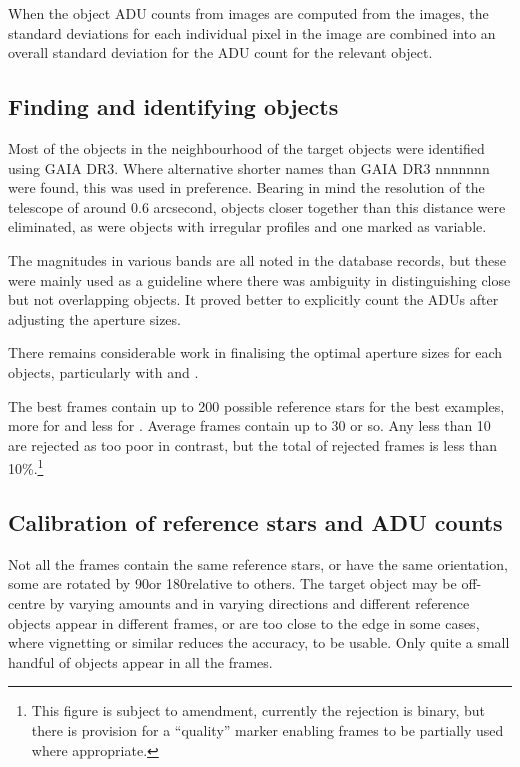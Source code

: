 When the object ADU counts from {\rem} images are computed from the images, the
standard deviations for each individual pixel in the image are combined into an
overall standard deviation for the ADU count for the relevant object.

\subsection{Finding and identifying objects}
\protect\label{section:findingidentify}

Most of the objects in the neighbourhood of the target {\rdwarf} objects were
identified using GAIA DR3. Where alternative shorter names than GAIA DR3 nnnnnnn
were found, this was used in preference. Bearing in mind the resolution of the
{\rem} telescope of around 0.6 arcsecond, objects closer together than this
distance were eliminated, as were objects with irregular profiles and one marked
as variable.

The magnitudes in various bands are all noted in the database records, but these
were mainly used as a guideline where there was ambiguity in distinguishing
close but not overlapping objects. It proved better to explicitly count the ADUs
after adjusting the aperture sizes.

There remains considerable work in finalising the optimal aperture sizes for
each objects, particularly with {\prox} and {\bstar}.

The best frames contain up to 200 possible reference stars for the best
examples, more for {\prox} and less for {\bstar}. Average frames contain up to
30 or so. Any less than 10 are rejected as too poor in contrast, but the total of rejected frames is less than
10\%.\footnote{This figure is subject to amendment, currently the rejection is
binary, but there is provision for a ``quality'' marker enabling frames to be
partially used where appropriate.}

\subsection{Calibration of reference stars and ADU counts}
\protect\label{section:calibrationrefstars}

Not all the frames contain the same reference stars, or have the same
orientation, some are rotated by 90\degree or 180\degree relative to others. The
target object may be off-centre by varying amounts and in varying directions and
different reference objects appear in different frames, or are too close to the
edge in some cases, where vignetting or similar reduces the accuracy, to be
usable. Only quite a small handful of objects appear in all the frames.


